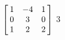 {$\left[\hskip -3pt \begin{array}{ccc} 1&-4&1\\  0&3&0
\\  1&2&2\end{array}\hskip -3pt \right] $} 
{$3$}

  

 

